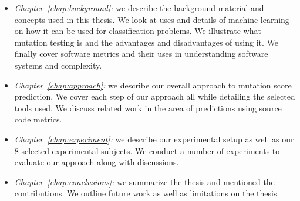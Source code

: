 \begin{itemize}
  \item \emph{Chapter~\ref{chap:background}:} we describe the background material and concepts used in this thesis. We look at uses and details of machine learning on how it can be used for classification problems. We illustrate what mutation testing is and  the advantages and disadvantages of using it. We finally cover software metrics and their uses in understanding software systems and complexity.
  \item \emph{Chapter~\ref{chap:approach}:} we describe our overall approach to mutation score prediction. We cover each step of our approach all while detailing the selected tools used. We discuss related work in the area of predictions using source code metrics.
  \item \emph{Chapter~\ref{chap:experiment}:} we describe our experimental setup as well as our 8 selected experimental subjects. We conduct a number of experiments to evaluate our approach along with discussions.
  \item \emph{Chapter~\ref{chap:conclusions}:} we summarize the thesis and mentioned the contributions. We outline future work as well as limitations on the thesis.
\end{itemize}
